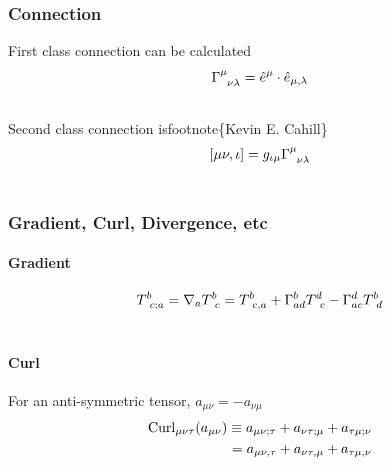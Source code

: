 \documentclass[letterpaper,10pt,english]{sphinxmanual}
\begin{document}
\subsubsection{Connection}
\label{math:connection}
First class connection can be calculated
\begin{gather}
\begin{split}\Gamma^\mu_{\phantom{\mu}\nu\lambda}=\hat e^\mu\cdot \hat e_{\mu,\lambda}\end{split}\notag\\\begin{split}\end{split}\notag
\end{gather}
Second class connection isfootnote\{Kevin E. Cahill\}
\begin{gather}
\begin{split}[\mu\nu,\iota]=g_{\iota\mu}\Gamma^\mu_{\phantom{\mu}\nu\lambda}\end{split}\notag\\\begin{split}\end{split}\notag
\end{gather}

\subsubsection{Gradient, Curl, Divergence, etc}
\label{math:gradient-curl-divergence-etc}

\paragraph{Gradient}
\label{math:gradient}\begin{gather}
\begin{split}T^b_{\phantom bc;a}= \nabla_aT^b_{\phantom bc}=T^b_{\phantom bc,a}+\Gamma^b_{ad}T^d_{\phantom dc}-\Gamma^d_{ac}T^b_{\phantom bd}\end{split}\notag\\\begin{split}\end{split}\notag
\end{gather}

\paragraph{Curl}
\label{math:curl}
For an anti-symmetric tensor, $a_{\mu\nu}=-a_{\nu\mu}$
\begin{gather}
\begin{split}\mathrm{Curl}_{\mu\nu\tau}(a_{\mu\nu})  \equiv  a_{\mu\nu;\tau}+a_{\nu\tau;\mu}+a_{\tau\mu;\nu} \\
 = a_{\mu\nu,\tau}+a_{\nu\tau,\mu}+a_{\tau\mu,\nu}\end{split}\notag\\\begin{split}\end{split}\notag
\end{gather}
\end{document}
